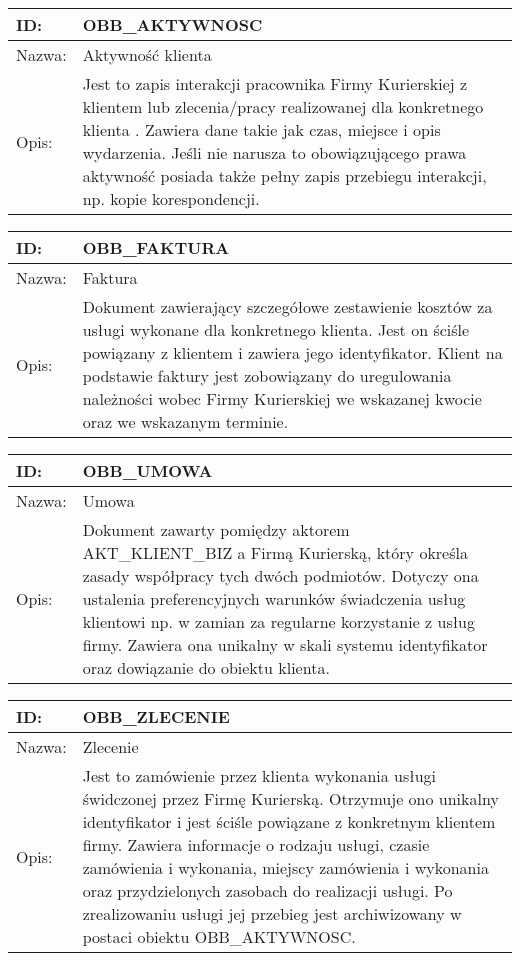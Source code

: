 \begin{center}
\begin{tabular}[h]{|p{1.6cm}|p{13.5cm}|}
\hline
ID: & OBB\_AKTYWNOSC \\ \hline
Nazwa: & Aktywność klienta \\ \hline
Opis: & Jest to zapis interakcji pracownika Firmy Kurierskiej z klientem lub zlecenia/pracy realizowanej dla konkretnego klienta . Zawiera dane takie jak czas, miejsce i opis wydarzenia. Jeśli nie narusza to obowiązującego prawa aktywność posiada także pełny zapis przebiegu interakcji, np. kopie korespondencji.  \\
\hline
\end{tabular}
\end{center}

\begin{center}
\begin{tabular}[h]{|p{1.6cm}|p{13.5cm}|}
\hline
ID: & OBB\_FAKTURA \\ \hline
Nazwa: & Faktura \\ \hline
Opis: & Dokument zawierający szczegółowe zestawienie kosztów za usługi wykonane dla konkretnego klienta. Jest on ściśle powiązany z klientem i zawiera jego identyfikator. Klient na podstawie faktury jest zobowiązany do uregulowania należności wobec Firmy Kurierskiej we wskazanej kwocie oraz we wskazanym terminie. \\
\hline
\end{tabular}
\end{center}

\begin{center}
\begin{tabular}[h]{|p{1.6cm}|p{13.5cm}|}
\hline
ID: & OBB\_UMOWA \\ \hline
Nazwa: & Umowa \\ \hline
Opis: & Dokument zawarty pomiędzy aktorem AKT\_KLIENT\_BIZ a Firmą Kurierską, który określa zasady współpracy tych dwóch podmiotów. Dotyczy ona ustalenia preferencyjnych warunków świadczenia usług klientowi np. w zamian za regularne korzystanie z usług firmy. Zawiera ona unikalny w skali systemu identyfikator oraz dowiązanie do obiektu klienta. \\
\hline
\end{tabular}
\end{center}

\begin{center}
\begin{tabular}[h]{|p{1.6cm}|p{13.5cm}|}
\hline
ID: & OBB\_ZLECENIE \\ \hline
Nazwa: & Zlecenie \\ \hline
Opis: & Jest to zamówienie przez klienta wykonania usługi świdczonej przez Firmę Kurierską. Otrzymuje ono unikalny identyfikator i jest ściśle powiązane z konkretnym klientem firmy. Zawiera informacje o rodzaju usługi, czasie zamówienia i wykonania, miejscy zamówienia i wykonania oraz przydzielonych zasobach do realizacji usługi. Po zrealizowaniu usługi jej przebieg jest archiwizowany w postaci obiektu OBB\_AKTYWNOSC. \\
\hline
\end{tabular}
\end{center}

